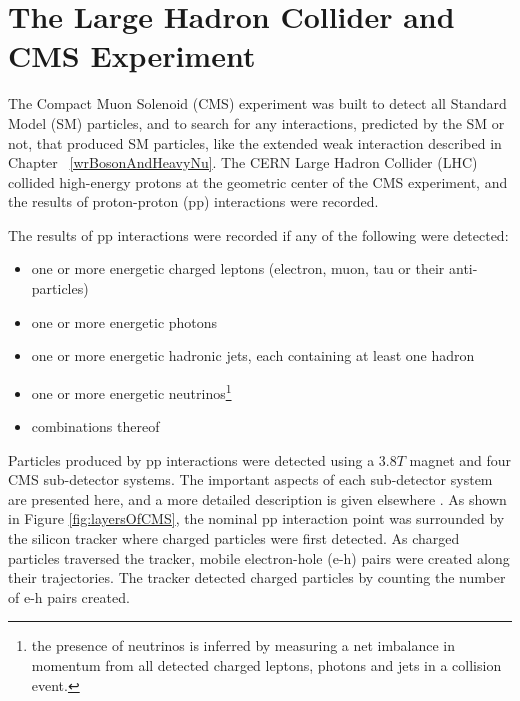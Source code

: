 \chapter{The Large Hadron Collider and CMS Experiment}
\label{sec:experiment_chapter}
The Compact Muon Solenoid (CMS) experiment was built to detect all Standard Model (SM) particles, and to
search for any interactions, predicted by the SM or not, that produced SM particles, like the extended 
weak interaction described in Chapter ~\ref{wrBosonAndHeavyNu}.  The CERN Large Hadron Collider (LHC) 
collided high-energy protons at the geometric center of the CMS experiment, and the results of proton-proton (pp) 
interactions were recorded.

The results of pp interactions were recorded if any of the following were detected:
\begin{itemize}
	\item one or more energetic charged leptons (electron, muon, tau or their anti-particles)
	\item one or more energetic photons
	\item one or more energetic hadronic jets, each containing at least one hadron
	\item one or more energetic neutrinos\footnote{the presence of neutrinos is inferred by measuring a net imbalance in 
		momentum from all detected charged leptons, photons and jets in a collision event.}
	\item combinations thereof
\end{itemize}
Particles produced by pp interactions were detected using a 3.8$\unit{T}$ magnet and four CMS 
sub-detector systems.  The important aspects of each sub-detector system are presented here, and a more detailed 
description is given elsewhere \cite{cmsDetectorPaper}.  As shown in Figure \ref{fig:layersOfCMS}, the nominal pp interaction point 
was surrounded by the silicon tracker where charged particles were first detected.  As charged particles traversed
the tracker, mobile electron-hole (e-h) pairs were created along their trajectories.  The tracker detected 
charged particles by counting the number of e-h pairs created.

